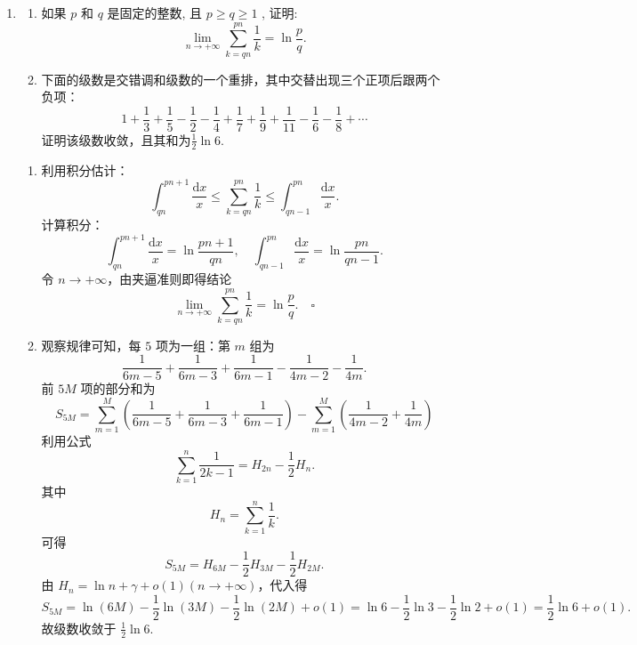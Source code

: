 \begin{enumerate}
    \item[8.]
    \begin{enumerate}
        \item[(a)]如果 \(p\) 和 \(q\) 是固定的整数, 且 \(\displaystyle p \geq q \geq 1\) , 证明:
        \[\displaystyle\lim_{n \to +\infty} \sum_{k = q n}^{p n} \frac{1}{k} = \ln \frac{p}{q}.\]
        \item[(b)]下面的级数是交错调和级数的一个重排，其中交替出现三个正项后跟两个负项：
        \[\displaystyle 1 + \frac{1}{3} + \frac{1}{5} -\frac{1}{2} -\frac{1}{4} + \frac{1}{7} + \frac{1}{9} + \frac{1}{11} -\frac{1}{6} -\frac{1}{8} + \cdots\]
        证明该级数收敛，且其和为\(\displaystyle\frac{1}{2} \ln{6}\).
    \end{enumerate}
    \begin{solution}
        \begin{enumerate}
        \item[(a)] 利用积分估计：
        \[
        \int_{qn}^{pn+1} \frac{\mathrm{d}x}{x} \le \sum_{k=qn}^{pn} \frac{1}{k} \le \int_{qn-1}^{pn} \frac{\mathrm{d}x}{x}.
        \]
        计算积分：
        \[
        \int_{qn}^{pn+1} \frac{\mathrm{d}x}{x} = \ln{\frac{pn+1}{qn}}, \quad \int_{qn-1}^{pn} \frac{\mathrm{d}x}{x} = \ln{\frac{pn}{qn-1}}.
        \]
        令 $n\to+\infty$，由夹逼准则即得结论
        \[
        \lim_{n\to+\infty}\sum_{k=qn}^{pn}\frac{1}{k}=\ln\frac{p}{q}. \quad \square
        \]

        \item[(b)]
        观察规律可知，每 $5$ 项为一组：第 $m$ 组为
        \[
        \frac{1}{6m-5} + \frac{1}{6m-3} + \frac{1}{6m-1} - \frac{1}{4m-2} - \frac{1}{4m}.
        \]
        前 $5M$ 项的部分和为
        \[
        S_{5M} = \sum_{m=1}^{M} \left( \frac{1}{6m-5} + \frac{1}{6m-3} + \frac{1}{6m-1} \right) - \sum_{m=1}^{M} \left( \frac{1}{4m-2} + \frac{1}{4m} \right)
        \]
        利用公式 
        \[
        \sum_{k=1}^{n} \frac{1}{2k-1} = H_{2n} - \frac{1}{2} H_n.
        \]
        其中 
        \[
        H_n = \sum_{k=1}^{n} \frac{1}{k}.
        \]
        可得
        \[
        S_{5M} = H_{6M} - \frac{1}{2} H_{3M} - \frac{1}{2} H_{2M}.
        \]
        由 $H_n = \ln n + \gamma + o(1)(n\to+\infty)$，代入得
        \[
        S_{5M} = \ln(6M) - \frac{1}{2} \ln(3M) - \frac{1}{2} \ln(2M) + o(1) = \ln 6 - \frac{1}{2} \ln 3 - \frac{1}{2} \ln 2 + o(1) = \frac{1}{2} \ln 6 + o(1).
        \]
        故级数收敛于 $\displaystyle \frac{1}{2}\ln{6}$.
        \end{enumerate}
    \end{solution}
\end{enumerate}

